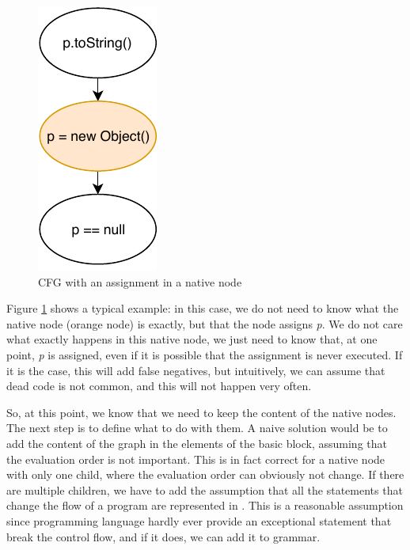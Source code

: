 \begin{figure}[h]
	\caption{CFG with an assignment in a native node}
	\label{figure:cfg-with-assignment-native}
	\includegraphics[]{figure/cfg-with-assignment-native.pdf}
\end{figure}

Figure \ref{figure:cfg-with-assignment-native} shows a typical example: in this case, we do not need to know what the native node (orange node) is exactly, but that the node assigns \emph{p}. We do not care what exactly happens in this native node, we just need to know that, at one point, \emph{p} is assigned, even if it is possible that the assignment is never executed. If it is the case, this will add false negatives, but intuitively, we can assume that dead code is not common, and this will not happen very often.

So, at this point, we know that we need to keep the content of the native nodes. 
The next step is to define what to do with them. 
A naive solution would be to add the content of the graph in the elements of the basic block, assuming that the evaluation order is not important. 
This is in fact correct for a native node with only one child, where the evaluation order can obviously not change. 
If there are multiple children, we have to add the assumption that all the statements that change the flow of a program are represented in \slang{}. 
This is a reasonable assumption since programming language hardly ever provide an exceptional statement that break the control flow, and if it does, we can add it to \slang{} grammar.



